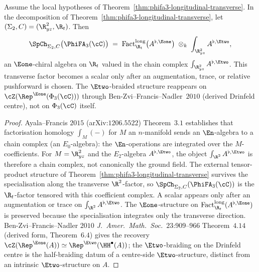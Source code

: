\begin{proposition}
\label{prop:specialisation-consumes-e2}
Assume the local hypotheses of Theorem~\ref{thm:phifa3-longitudinal-transverse}.
In the decomposition of Theorem~\ref{thm:phifa3-longitudinal-transverse}, let $(\Sigma_2, C) = (\R^2_{yz}, \R_t)$. Then
\[
 \SpCh_{\Sigma_2, C}\bigl(\PhiFA_3(\cC)\bigr)
 \;=\;
 \mathrm{Fact}^{\mathrm{long}}_{\R_t}\bigl(A^{\flat, \Eone}\bigr)
 \;\otimes_k\;
 \int_{\R^2_{yz}} A^{\flat, \Etwo},
\]
an $\Eone$-chiral algebra on $\R_t$ valued in the chain complex
\(\int_{\R^2_{yz}} A^{\flat,\Etwo}\).  This transverse factor becomes a
scalar only after an augmentation, trace, or relative pushforward is
chosen. The $\Etwo$-braided structure reappears on
$\cZ(\Rep^{\Eone}(\Phi_3(\cC)))$ through Ben-Zvi--Francis--Nadler~$2010$
(derived Drinfeld centre), not on $\Phi_3(\cC)$ itself.
\end{proposition}

\begin{proof}
Ayala--Francis $2015$ (arXiv:$1206.5522$) Theorem~$3.1$ establishes
that factorisation homology \(\int_M(-)\) for \(M\) an \(n\)-manifold
sends an \(\En\)-algebra to a chain complex (an \(E_0\)-algebra): the
\(\En\)-operations are integrated over the \(M\)-coefficients.  For
\(M=\R^2_{yz}\) and the \(E_2\)-algebra \(A^{\flat,\Etwo}\), the object
\(\int_{\R^2}A^{\flat,\Etwo}\) is therefore a chain complex, not
canonically the ground field.  The external tensor-product structure of
Theorem~\ref{thm:phifa3-longitudinal-transverse} survives the
specialisation along the transverse \(\R^2\)-factor, so
\(\SpCh_{\Sigma_2,C}(\PhiFA_3(\cC))\) is the \(\R_t\)-factor tensored
with this coefficient complex.  A scalar appears only after an
augmentation or trace on \(\int_{\R^2}A^{\flat,\Etwo}\).  The
\(\Eone\)-structure on
\(\mathrm{Fact}^{\mathrm{long}}_{\R_t}(A^{\flat,\Eone})\) is preserved
because the specialisation integrates only the transverse direction.
Ben-Zvi--Francis--Nadler $2010$ \textit{J.~Amer.~Math.~Soc.}~$23$:$909$--$966$
Theorem~$4.14$ (derived form, Theorem~$6.4$) gives the recovery
\(\cZ(\Rep^{\Eone}(A)) \simeq \Rep^{\Etwo}(\HH^\bullet(A))\); the
\(\Etwo\)-braiding on the Drinfeld centre is the half-braiding datum of
a centre-side \(\Etwo\)-structure, distinct from an intrinsic
\(\Etwo\)-structure on \(A\).
\end{proof}

